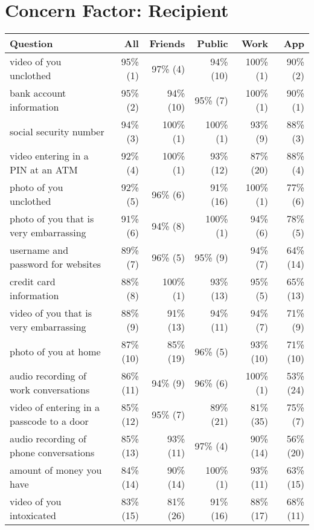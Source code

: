 
\section{Concern Factor: Recipient}
\label{sec:recipient-appendix} 

\begin{table*}[t]
\begin{center}
\small
\begin{tabular}{| l | r | r | r | r | r |}
\hline
Question & All & Friends & Public & Work& App \\
\hline
video of you unclothed & 95\% (1) & 97\% (4) & 94\% (10) & 100\% (1) & 90\% (2) \\ 
bank account information & 95\% (2) & 94\% (10) & 95\% (7) & 100\% (1) & 90\% (1) \\ 
social security number & 94\% (3) & 100\% (1) & 100\% (1) & 93\% (9) & 88\% (3) \\ 
video entering in a PIN at an ATM & 92\% (4) & 100\% (1) & 93\% (12) & 87\% (20) & 88\% (4) \\ 
photo of you unclothed & 92\% (5) & 96\% (6) & 91\% (16) & 100\% (1) & 77\% (6) \\ 
photo of you that is very embarrassing & 91\% (6) & 94\% (8) & 100\% (1) & 94\% (6) & 78\% (5) \\ 
username and password for websites & 89\% (7) & 96\% (5) & 95\% (9) & 94\% (7) & 64\% (14) \\ 
credit card information & 88\% (8) & 100\% (1) & 93\% (13) & 95\% (5) & 65\% (13) \\ 
video of you that is very embarrassing & 88\% (9) & 91\% (13) & 94\% (11) & 94\% (7) & 71\% (9) \\ 
photo of you at home & 87\% (10) & 85\% (19) & 96\% (5) & 93\% (10) & 71\% (10) \\ 
audio recording of work conversations & 86\% (11) & 94\% (9) & 96\% (6) & 100\% (1) & 53\% (24) \\ 
video of entering in a passcode to a door & 85\% (12) & 95\% (7) & 89\% (21) & 81\% (35) & 75\% (7) \\ 
audio recording of phone conversations & 85\% (13) & 93\% (11) & 97\% (4) & 90\% (14) & 56\% (20) \\ 
amount of money you have & 84\% (14) & 90\% (14) & 100\% (1) & 93\% (11) & 63\% (15) \\ 
video of you intoxicated & 83\% (15) & 81\% (26) & 91\% (16) & 88\% (17) & 68\% (11) \\ 

\end{tabular}
\end{center}
\end{table*}
